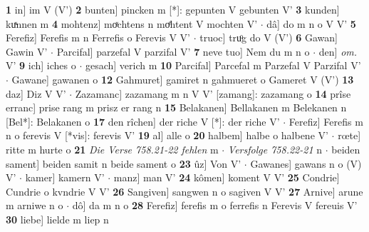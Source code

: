 \documentclass[8pt,a4paper,notitlepage]{article}
\begin{document}
\begin{table}[ht]
\begin{minipage}[t]{0.5\linewidth}
\textbf{1} in] im V (V') \textbf{2} bunten] pincken m [*]: gepunten V gebunten V' \textbf{3} kunden] kuͯnnen m \textbf{4} mohtenz] moͯchtens n moͤhtent V mochten V'  $\cdot$ dâ] do m n o V V' \textbf{5} Ferefiz] Ferefis m n Ferrefis o Ferevis V V'  $\cdot$ truoc] truͦg do V (V') \textbf{6} Gawan] Gawin V'  $\cdot$ Parcifal] parzefal V parzifal V' \textbf{7} neve tuo] Nem du m n o  $\cdot$ den] \textit{om.} V' \textbf{9} ich] iches o  $\cdot$ gesach] verich m \textbf{10} Parcifal] Parcefal m Parzefal V Parzifal V'  $\cdot$ Gawane] gawanen o \textbf{12} Gahmuret] gamiret n gahmueret o Gameret V (V') \textbf{13} daz] Diz V V'  $\cdot$ Zazamanc] zazamang m n V V' [zamang]: zazamang o \textbf{14} prîse erranc] prise rang m prisz er rang n \textbf{15} Belakanen] Bellakanen m Belekanen n [Bel*]: Belakanen o \textbf{17} den rîchen] der riche V [*]: der riche V'  $\cdot$ Ferefiz] Ferefis m n o ferevis V [*vis]: ferevis V' \textbf{19} al] alle o \textbf{20} halbem] halbe o halbene V'  $\cdot$ rœte] ritte m hurte o \textbf{21} \textit{Die Verse 758.21-22 fehlen} m   $\cdot$ \textit{Versfolge 758.22-21} n   $\cdot$ beiden sament] beiden samit n beide sament o \textbf{23} ûz] Von V'  $\cdot$ Gawanes] gawans n o (V) V'  $\cdot$ kamer] kamern V'  $\cdot$ manz] man V' \textbf{24} kômen] koment V V' \textbf{25} Condrie] Cundrie o kvndrie V V' \textbf{26} Sangiven] sangwen n o sagiven V V' \textbf{27} Arnive] arune m arniwe n o  $\cdot$ dô] da m n o \textbf{28} Ferefiz] ferefis m o ferrefis n Ferevis V fereuis V' \textbf{30} liebe] lielde m liep n \newline
\end{minipage}
\end{table}
\newpage
\end{document}
